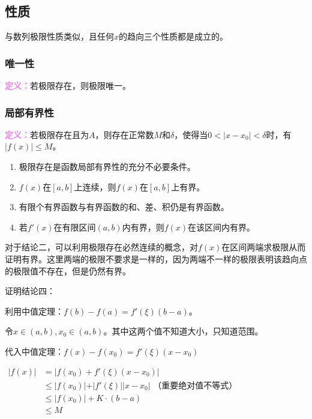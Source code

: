 \documentclass[UTF8, 12pt]{ctexart}
\begin{document}
\subsection{性质}

与数列极限性质类似，且任何$x$的趋向三个性质都是成立的。

\subsubsection{唯一性}

\textcolor{violet}{\textbf{定义：}}若极限存在，则极限唯一。

\subsubsection{局部有界性}

\textcolor{violet}{\textbf{定义：}}若极限存在且为$A$，则存在正常数$M$和$\delta$，使得当$0<\vert x-x_0\vert<\delta$时，有$\vert f(x)\vert\leqslant M$。

\begin{enumerate}
    \item 极限存在是函数局部有界性的充分不必要条件。
    \item $f(x)$在$[a,b]$上连续，则$f(x)$在$[a,b]$上有界。
    \item 有限个有界函数与有界函数的和、差、积仍是有界函数。
    \item 若$f'(x)$在有限区间$(a,b)$内有界，则$f(x)$在该区间内有界。
\end{enumerate}

对于结论二，可以利用极限存在必然连续的概念，对$f(x)$在区间两端求极限从而证明有界。这里两端的极限不要求是一样的，因为两端不一样的极限表明该趋向点的极限值不存在，但是仍然有界。

证明结论四：

利用中值定理：$f(b)-f(a)=f'(\xi)(b-a)$。

令$x\in(a,b),x_0\in(a,b)$。其中这两个值不知道大小，只知道范围。

代入中值定理：$f(x)-f(x_0)=f'(\xi)(x-x_0)$

$
\begin{aligned}
    \vert f(x)\vert & =\vert f(x_0)+f'(\xi)(x-x_0)\vert \\
    & \leqslant\vert f(x_0)\vert+\vert f'(\xi)\vert\vert x-x_0\vert\text{ （重要绝对值不等式）} \\
    & \leqslant\vert f(x_0)\vert+K\cdot(b-a) \\
    & \leqslant M
\end{aligned}
$
\end{document}

